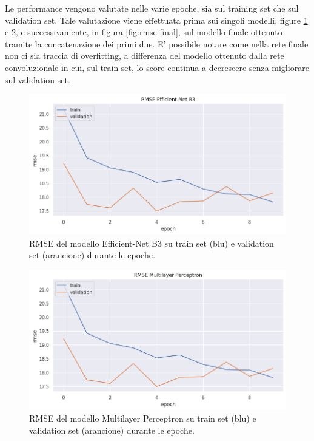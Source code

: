 Le performance vengono valutate nelle varie epoche, sia sul training set che sul validation set. Tale valutazione viene effettuata prima sui singoli modelli, figure \ref{fig:rmse-cnn} e \ref{fig:rmse-mlp}, e successivamente, in figura \ref{fig:rmse-final}, sul modello finale ottenuto tramite la concatenazione dei primi due. E' possibile notare come nella rete finale non ci sia traccia di overfitting, a differenza del modello ottenuto dalla rete convoluzionale in cui, sul train set, lo score continua a decrescere senza migliorare sul validation set. 


    \begin{figure}[h]
        \centering
        \includegraphics[scale=0.6]{Plot/CNN_RMSE.png}
        \caption{RMSE del modello Efficient-Net B3 su train set (blu) e validation set (arancione) durante le epoche.}
        \label{fig:rmse-cnn}
    \end{figure}

\newpage


    \begin{figure}[h]
        \centering
        \vspace*{-2.5cm}
        \includegraphics[scale=0.55]{Plot/MLP_RMSE.png}
        \caption{RMSE del modello Multilayer Perceptron su train set (blu) e validation set (arancione) durante le epoche.}
        \label{fig:rmse-mlp}
    \end{figure}
    

